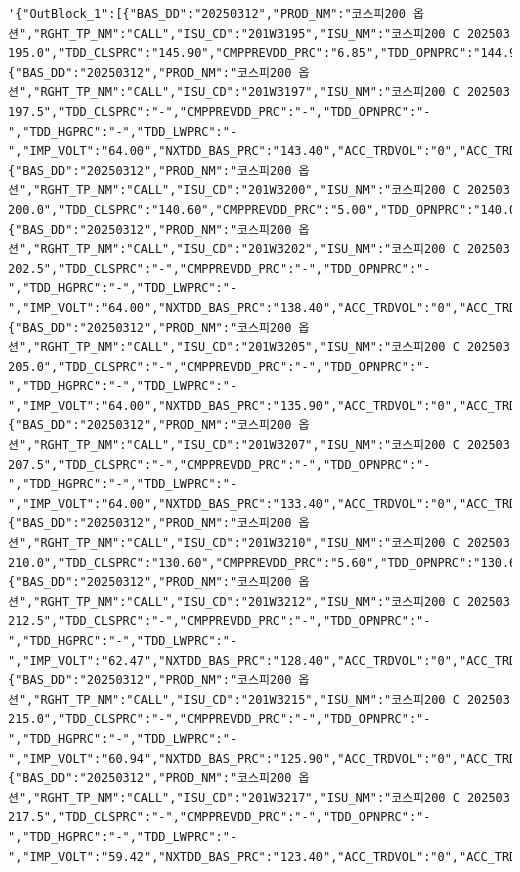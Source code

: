 \documentclass[
  a4paper,
  DIV=11,
  numbers=noendperiod]{scrreprt}
\begin{document}
\begin{tcolorbox}
\begin{verbatim}
'{"OutBlock_1":[{"BAS_DD":"20250312","PROD_NM":"코스피200 옵션","RGHT_TP_NM":"CALL","ISU_CD":"201W3195","ISU_NM":"코스피200 C 202503 195.0","TDD_CLSPRC":"145.90","CMPPREVDD_PRC":"6.85","TDD_OPNPRC":"144.95","TDD_HGPRC":"146.10","TDD_LWPRC":"144.95","IMP_VOLT":"64.00","NXTDD_BAS_PRC":"145.90","ACC_TRDVOL":"31","ACC_TRDVAL":"1129625000","ACC_OPNINT_QTY":"154"},{"BAS_DD":"20250312","PROD_NM":"코스피200 옵션","RGHT_TP_NM":"CALL","ISU_CD":"201W3197","ISU_NM":"코스피200 C 202503 197.5","TDD_CLSPRC":"-","CMPPREVDD_PRC":"-","TDD_OPNPRC":"-","TDD_HGPRC":"-","TDD_LWPRC":"-","IMP_VOLT":"64.00","NXTDD_BAS_PRC":"143.40","ACC_TRDVOL":"0","ACC_TRDVAL":"0","ACC_OPNINT_QTY":"0"},{"BAS_DD":"20250312","PROD_NM":"코스피200 옵션","RGHT_TP_NM":"CALL","ISU_CD":"201W3200","ISU_NM":"코스피200 C 202503 200.0","TDD_CLSPRC":"140.60","CMPPREVDD_PRC":"5.00","TDD_OPNPRC":"140.00","TDD_HGPRC":"141.15","TDD_LWPRC":"139.95","IMP_VOLT":"64.00","NXTDD_BAS_PRC":"140.60","ACC_TRDVOL":"31","ACC_TRDVAL":"1088750000","ACC_OPNINT_QTY":"290"},{"BAS_DD":"20250312","PROD_NM":"코스피200 옵션","RGHT_TP_NM":"CALL","ISU_CD":"201W3202","ISU_NM":"코스피200 C 202503 202.5","TDD_CLSPRC":"-","CMPPREVDD_PRC":"-","TDD_OPNPRC":"-","TDD_HGPRC":"-","TDD_LWPRC":"-","IMP_VOLT":"64.00","NXTDD_BAS_PRC":"138.40","ACC_TRDVOL":"0","ACC_TRDVAL":"0","ACC_OPNINT_QTY":"0"},{"BAS_DD":"20250312","PROD_NM":"코스피200 옵션","RGHT_TP_NM":"CALL","ISU_CD":"201W3205","ISU_NM":"코스피200 C 202503 205.0","TDD_CLSPRC":"-","CMPPREVDD_PRC":"-","TDD_OPNPRC":"-","TDD_HGPRC":"-","TDD_LWPRC":"-","IMP_VOLT":"64.00","NXTDD_BAS_PRC":"135.90","ACC_TRDVOL":"0","ACC_TRDVAL":"0","ACC_OPNINT_QTY":"0"},{"BAS_DD":"20250312","PROD_NM":"코스피200 옵션","RGHT_TP_NM":"CALL","ISU_CD":"201W3207","ISU_NM":"코스피200 C 202503 207.5","TDD_CLSPRC":"-","CMPPREVDD_PRC":"-","TDD_OPNPRC":"-","TDD_HGPRC":"-","TDD_LWPRC":"-","IMP_VOLT":"64.00","NXTDD_BAS_PRC":"133.40","ACC_TRDVOL":"0","ACC_TRDVAL":"0","ACC_OPNINT_QTY":"0"},{"BAS_DD":"20250312","PROD_NM":"코스피200 옵션","RGHT_TP_NM":"CALL","ISU_CD":"201W3210","ISU_NM":"코스피200 C 202503 210.0","TDD_CLSPRC":"130.60","CMPPREVDD_PRC":"5.60","TDD_OPNPRC":"130.60","TDD_HGPRC":"130.60","TDD_LWPRC":"130.60","IMP_VOLT":"64.00","NXTDD_BAS_PRC":"130.60","ACC_TRDVOL":"1","ACC_TRDVAL":"32650000","ACC_OPNINT_QTY":"20"},{"BAS_DD":"20250312","PROD_NM":"코스피200 옵션","RGHT_TP_NM":"CALL","ISU_CD":"201W3212","ISU_NM":"코스피200 C 202503 212.5","TDD_CLSPRC":"-","CMPPREVDD_PRC":"-","TDD_OPNPRC":"-","TDD_HGPRC":"-","TDD_LWPRC":"-","IMP_VOLT":"62.47","NXTDD_BAS_PRC":"128.40","ACC_TRDVOL":"0","ACC_TRDVAL":"0","ACC_OPNINT_QTY":"0"},{"BAS_DD":"20250312","PROD_NM":"코스피200 옵션","RGHT_TP_NM":"CALL","ISU_CD":"201W3215","ISU_NM":"코스피200 C 202503 215.0","TDD_CLSPRC":"-","CMPPREVDD_PRC":"-","TDD_OPNPRC":"-","TDD_HGPRC":"-","TDD_LWPRC":"-","IMP_VOLT":"60.94","NXTDD_BAS_PRC":"125.90","ACC_TRDVOL":"0","ACC_TRDVAL":"0","ACC_OPNINT_QTY":"59"},{"BAS_DD":"20250312","PROD_NM":"코스피200 옵션","RGHT_TP_NM":"CALL","ISU_CD":"201W3217","ISU_NM":"코스피200 C 202503 217.5","TDD_CLSPRC":"-","CMPPREVDD_PRC":"-","TDD_OPNPRC":"-","TDD_HGPRC":"-","TDD_LWPRC":"-","IMP_VOLT":"59.42","NXTDD_BAS_PRC":"123.40","ACC_TRDVOL":"0","ACC_TRDVAL":"0","ACC_OPNINT_QTY":"0"}]}'

\end{verbatim}
\end{tcolorbox}
\end{document}
